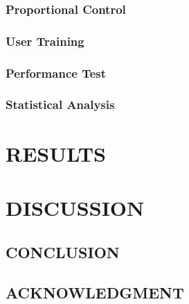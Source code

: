 \begin{multicols}{2}
	\subsubsection*{Proportional Control}
	
	
	\subsubsection*{User Training}
	
	
	\subsubsection*{Performance Test}

	
	
	\subsubsection*{Statistical Analysis}
	
	
	\section*{RESULTS}%
	
	
	
	\section*{DISCUSSION}%
	
	
	
	\subsection*{CONCLUSION}%
	
	
	
	
	
	\subsection*{ACKNOWLEDGMENT}
	

\end{multicols}
